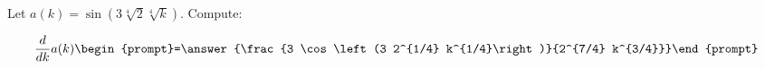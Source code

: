 \documentclass{ximera}
\author{Bart Snapp}
\begin{document}
\begin{exercise}
Let $a(k) = \sin \left(3 \sqrt[4]{2} \sqrt[4]{k}\right)$. Compute:

\[
\frac{d}{dk}a(k)
\begin{prompt}=\answer{\frac{3 \cos \left(3 2^{1/4} k^{1/4}\right)}{2^{7/4} k^{3/4}}}\end{prompt}
\]
\end{exercise}
\end{document}
